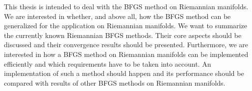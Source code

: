 This thesis is intended to deal with the BFGS method on Riemannian manifolds. We are interested in whether, and above all, how the BFGS method can be generalized for the application on Riemannian manifolds. We want to summarize the currently known Riemannian BFGS methods. Their core aspects should be discussed and their convergence results should be presented. Furthermore, we are interested in how a BFGS method on Riemannian manifolds can be implemented efficiently and which requirements have to be taken into account. An implementation of such a method should happen and its performance should be compared with results of other BFGS methods on Riemannian manifolds. \\
